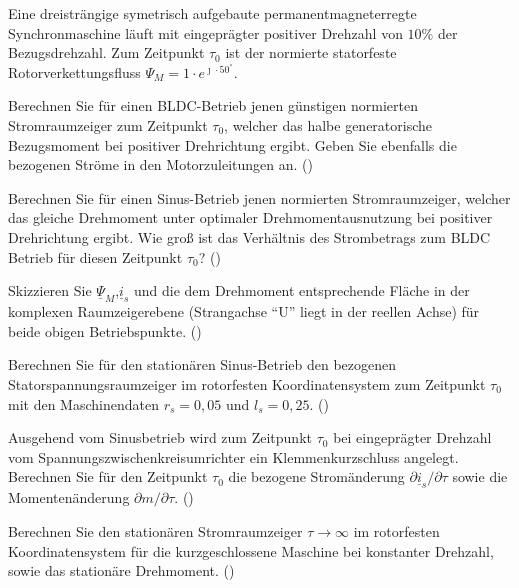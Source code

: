 \begin{question}[section=1,name={3.12.2013},mode=exm,type=bsp,tags={20131203}]
Eine dreisträngige symetrisch aufgebaute permanentmagneterregte Synchronmaschine läuft mit eingeprägter positiver Drehzahl von $10\%$ der Bezugsdrehzahl. Zum Zeitpunkt $\tau_0$ ist der normierte statorfeste Rotorverkettungsfluss $\Psi_M = 1 \cdot e^{\jmath \cdot 50 ^\circ}$.
\begin{compactenum}
\item Berechnen Sie für einen BLDC-Betrieb jenen günstigen normierten Stromraumzeiger zum Zeitpunkt $\tau_0$, welcher das halbe generatorische Bezugsmoment bei positiver Drehrichtung ergibt. Geben Sie ebenfalls die bezogenen Ströme in den Motorzuleitungen an. ()
\item Berechnen Sie für einen Sinus-Betrieb jenen normierten Stromraumzeiger, welcher das gleiche Drehmoment unter optimaler Drehmomentausnutzung bei positiver Drehrichtung ergibt. Wie groß ist das Verhältnis des Strombetrags zum BLDC Betrieb für diesen Zeitpunkt $\tau_0$? ()
\item Skizzieren Sie $\underline{\Psi}_M$,$\underline{i}_s$ und die dem Drehmoment entsprechende Fläche in der komplexen Raumzeigerebene (Strangachse "`U"' liegt in der reellen Achse) für beide obigen Betriebspunkte. ()
\item Berechnen Sie für den stationären Sinus-Betrieb den bezogenen Statorspannungsraumzeiger im rotorfesten Koordinatensystem zum Zeitpunkt $\tau_0$ mit den Maschinendaten $r_s = 0,05$ und $l_s = 0,25$. ()
\item Ausgehend vom Sinusbetrieb wird zum Zeitpunkt $\tau_0$ bei eingeprägter Drehzahl vom Spannungszwischenkreisumrichter ein Klemmenkurzschluss angelegt. Berechnen Sie für den Zeitpunkt $\tau_0$ die bezogene Stromänderung $\partial \underline{i}_s/\partial \tau$ sowie die Momentenänderung $\partial m/\partial \tau$. ()
\item Berechnen Sie den stationären Stromraumzeiger $ \tau \rightarrow \infty$ im rotorfesten Koordinatensystem für die kurzgeschlossene Maschine bei konstanter Drehzahl, sowie das stationäre Drehmoment. ()
\end{compactenum}
\end{question}
